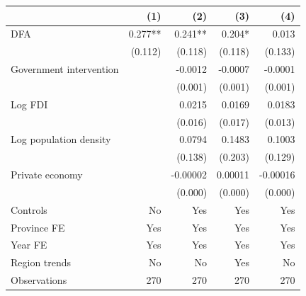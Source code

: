 \begin{tabular}{lrrrr}
\toprule
 & (1) & (2) & (3) & (4) \\
\midrule
DFA & 0.277** & 0.241** & 0.204* & 0.013 \\
 & (0.112) & (0.118) & (0.118) & (0.133) \\[2pt]
Government intervention &  & -0.0012 & -0.0007 & -0.0001 \\
 &  & (0.001) & (0.001) & (0.001) \\[2pt]
Log FDI &  & 0.0215 & 0.0169 & 0.0183 \\
 &  & (0.016) & (0.017) & (0.013) \\[2pt]
Log population density &  & 0.0794 & 0.1483 & 0.1003 \\
 &  & (0.138) & (0.203) & (0.129) \\[2pt]
Private economy &  & -0.00002 & 0.00011 & -0.00016 \\
 &  & (0.000) & (0.000) & (0.000) \\[2pt]
Controls & No & Yes & Yes & Yes \\
Province FE & Yes & Yes & Yes & Yes \\
Year FE & Yes & Yes & Yes & Yes \\
Region trends & No & No & Yes & No \\
Observations & 270 & 270 & 270 & 270 \\
\bottomrule
\end{tabular}